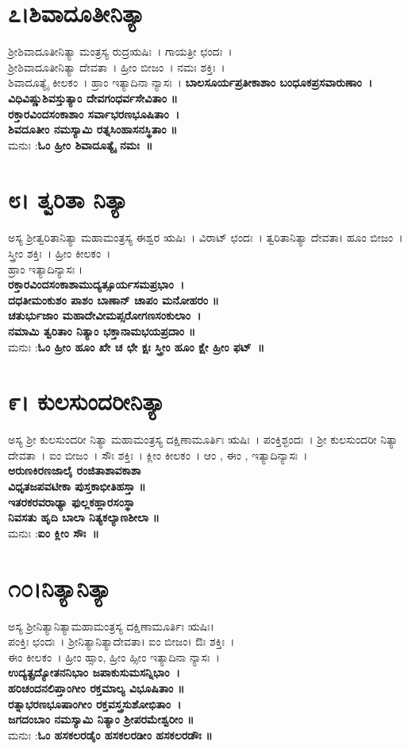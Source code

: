 \section{೭।ಶಿವಾದೂತೀನಿತ್ಯಾ}
ಶ್ರೀಶಿವಾದೂತೀನಿತ್ಯಾ ಮಂತ್ರಸ್ಯ ರುದ್ರಋಷಿಃ~। ಗಾಯತ್ರೀ ಛಂದಃ~।\\ ಶ್ರೀಶಿವಾದೂತೀನಿತ್ಯಾ ದೇವತಾ~। ಹ್ರೀಂ ಬೀಜಂ~। ನಮಃ ಶಕ್ತಿಃ~।\\ ಶಿವಾದೂತ್ಯೈ ಕೀಲಕಂ~। ಹ್ರಾಂ ಇತ್ಯಾದಿನಾ ನ್ಯಾಸಃ~।
{\bfseries ಬಾಲಸೂರ್ಯಪ್ರತೀಕಾಶಾಂ ಬಂಧೂಕಪ್ರಸವಾರುಣಾಂ~।\\
ವಿಧಿವಿಷ್ಣುಶಿವಸ್ತುತ್ಯಾಂ ದೇವಗಂಧರ್ವಸೇವಿತಾಂ ॥\\
ರಕ್ತಾರವಿಂದಸಂಕಾಶಾಂ ಸರ್ವಾಭರಣಭೂಷಿತಾಂ~।\\
ಶಿವದೂತೀಂ ನಮಸ್ಯಾಮಿ ರತ್ನಸಿಂಹಾಸನಸ್ಥಿತಾಂ ॥\\}
ಮನುಃ :{\bfseries  ಓಂ ಹ್ರೀಂ ಶಿವಾದೂತ್ಯೈ ನಮಃ~॥}
\section{೮। ತ್ವರಿತಾ ನಿತ್ಯಾ}
ಅಸ್ಯ ಶ್ರೀತ್ವರಿತಾನಿತ್ಯಾ ಮಹಾಮಂತ್ರಸ್ಯ ಈಶ್ವರ ಋಷಿಃ~। ವಿರಾಟ್ ಛಂದಃ~। ತ್ವರಿತಾನಿತ್ಯಾ ದೇವತಾ। ಹೂಂ ಬೀಜಂ~। ಸ್ತ್ರೀಂ ಶಕ್ತಿಃ~। ಹ್ರೀಂ ಕೀಲಕಂ~।\\
ಹ್ರಾಂ ಇತ್ಯಾದಿನ್ಯಾಸಃ ।\\
{\bfseries ರಕ್ತಾರವಿಂದಸಂಕಾಶಾಮುದ್ಯತ್ಸೂರ್ಯಸಮಪ್ರಭಾಂ~।\\
ದಧತೀಮಂಕುಶಂ ಪಾಶಂ ಬಾಣಾನ್ ಚಾಪಂ ಮನೋಹರಂ ॥\\
ಚತುರ್ಭುಜಾಂ ಮಹಾದೇವೀಮಪ್ಸರೋಗಣಸಂಕುಲಾಂ~।\\
ನಮಾಮಿ ತ್ವರಿತಾಂ ನಿತ್ಯಾಂ ಭಕ್ತಾನಾಮಭಯಪ್ರದಾಂ ॥\\}
ಮನುಃ :{\bfseries  ಓಂ ಹ್ರೀಂ ಹೂಂ ಖೇ ಚ ಛೇ ಕ್ಷಃ ಸ್ತ್ರೀಂ ಹೂಂ ಕ್ಷೇ ಹ್ರೀಂ ಫಟ್~॥}
\newpage
\section{೯। ಕುಲಸುಂದರೀನಿತ್ಯಾ}
ಅಸ್ಯ ಶ್ರೀ ಕುಲಸುಂದರೀ ನಿತ್ಯಾ ಮಹಾಮಂತ್ರಸ್ಯ ದಕ್ಷಿಣಾಮೂರ್ತಿಃ ಋಷಿಃ~। ಪಂಕ್ತಿಶ್ಛಂದಃ~। ಶ್ರೀ ಕುಲಸುಂದರೀ ನಿತ್ಯಾ ದೇವತಾ~। ಐಂ ಬೀಜಂ~। ಸೌಃ ಶಕ್ತಿಃ~। ಕ್ಲೀಂ ಕೀಲಕಂ~। ಆಂ , ಈಂ , ಇತ್ಯಾದಿನ್ಯಾಸಃ~।\\
{\bfseries ಅರುಣಕಿರಣಜಾಲೈ ರಂಜಿತಾಶಾವಕಾಶಾ\\
ವಿಧೃತಜಪವಟೀಕಾ ಪುಸ್ತಕಾಭೀತಿಹಸ್ತಾ ॥\\
ಇತರಕರವರಾಢ್ಯಾ ಫುಲ್ಲಕಹ್ಲಾರಸಂಸ್ಥಾ\\
ನಿವಸತು ಹೃದಿ ಬಾಲಾ ನಿತ್ಯಕಲ್ಯಾಣಶೀಲಾ ॥\\}
ಮನುಃ :{\bfseries  ಐಂ ಕ್ಲೀಂ ಸೌಃ~॥}
\section{೧೦।ನಿತ್ಯಾನಿತ್ಯಾ}
ಅಸ್ಯ ಶ್ರೀನಿತ್ಯಾನಿತ್ಯಾಮಹಾಮಂತ್ರಸ್ಯ ದಕ್ಷಿಣಾಮೂರ್ತಿಃ ಋಷಿಃ।\\ ಪಂಕ್ತಿಃ ಛಂದಃ~। ಶ್ರೀನಿತ್ಯಾನಿತ್ಯಾದೇವತಾ। ಐಂ ಬೀಜಂ। ಔಃ ಶಕ್ತಿಃ~।\\ ಈಂ ಕೀಲಕಂ~। ಹ್ರೀಂ ಹ್ಸಾಂ, ಹ್ರೀಂ ಹ್ಸೀಂ ಇತ್ಯಾದಿನಾ ನ್ಯಾಸಃ~।\\
{\bfseries ಉದ್ಯತ್ಪ್ರದ್ಯೋತನನಿಭಾಂ ಜಪಾಕುಸುಮಸನ್ನಿಭಾಂ~।\\
ಹರಿಚಂದನಲಿಪ್ತಾಂಗೀಂ ರಕ್ತಮಾಲ್ಯ ವಿಭೂಷಿತಾಂ ॥\\
ರತ್ನಾಭರಣಭೂಷಾಂಗೀಂ ರಕ್ತವಸ್ತ್ರಸುಶೋಭಿತಾಂ~।\\
ಜಗದಂಬಾಂ ನಮಸ್ಯಾಮಿ ನಿತ್ಯಾಂ ಶ್ರೀಪರಮೇಶ್ವರೀಂ ॥\\}
ಮನುಃ :{\bfseries  ಓಂ ಹಸಕಲರಡೈಂ ಹಸಕಲರಡೀಂ ಹಸಕಲರಡೌಃ ॥}
